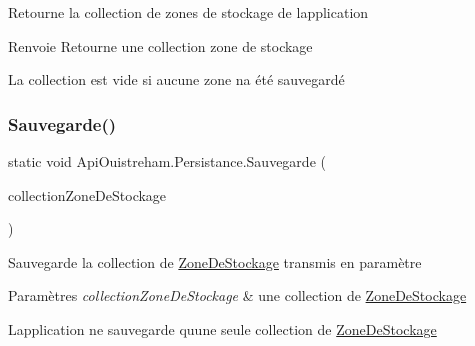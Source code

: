 Retourne la collection de zones de stockage de l\textquotesingle{}application 

\begin{DoxyReturn}{Renvoie}
Retourne une collection zone de stockage
\end{DoxyReturn}


La collection est vide si aucune zone n\textquotesingle{}a été sauvegardé\mbox{\label{class_api_ouistreham_1_1_persistance_a939761c48644380936f1dae6aa97e0e4}} 
\subsubsection{\texorpdfstring{Sauvegarde()}{Sauvegarde()}\hspace{0.1cm}{\footnotesize\ttfamily [1/2]}}
{\footnotesize\ttfamily static void Api\+Ouistreham.\+Persistance.\+Sauvegarde (\begin{DoxyParamCaption}\item[{List$<$ \hyperlink{class_api_ouistreham_1_1_zone_de_stockage}{Zone\+De\+Stockage} $>$}]{collection\+Zone\+De\+Stockage }\end{DoxyParamCaption})\hspace{0.3cm}{\ttfamily [static]}}



Sauvegarde la collection de \hyperlink{class_api_ouistreham_1_1_zone_de_stockage}{Zone\+De\+Stockage} transmis en paramètre 


\begin{DoxyParams}{Paramètres}
{\em collection\+Zone\+De\+Stockage} & une collection de \hyperlink{class_api_ouistreham_1_1_zone_de_stockage}{Zone\+De\+Stockage}\\
\hline
\end{DoxyParams}


L\textquotesingle{}application ne sauvegarde qu\textquotesingle{}une seule collection de \hyperlink{class_api_ouistreham_1_1_zone_de_stockage}{Zone\+De\+Stockage}\mbox{\label{class_api_ouistreham_1_1_persistance_a592a3f4399acf3f9b48779e6cfc4d526}} 
